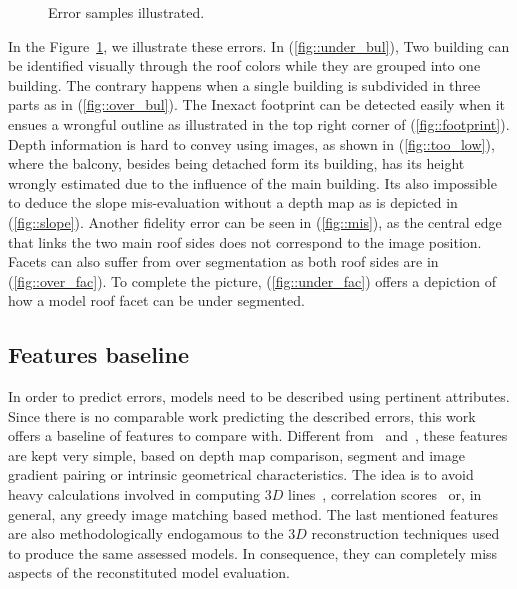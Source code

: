 \documentclass[runningheads]{llncs}
\newcounter{SubFigCounter}
\begin{document}
\begin{figure}[H]
\begin{center}
{{                    \label{fig::fac_err}
                    \addtocounter{figure}{-1}
                }
            }
            {
                \caption{\label{fig::samples}Error samples illustrated.}
            }
        \end{center}
    \end{figure}

    In the Figure~\ref{fig::samples}, we illustrate these errors. In (\ref{fig::under_bul}), Two building can be identified visually through the roof colors while they are grouped into one building. The contrary happens when a single building is subdivided in three parts as in (\ref{fig::over_bul}). The Inexact footprint can be detected easily when it ensues a wrongful outline as illustrated in the top right corner of (\ref{fig::footprint}). Depth information is hard to convey using images, as shown in (\ref{fig::too_low}), where the balcony, besides being detached form its building, has its height wrongly estimated due to the influence of the main building. Its also impossible to deduce the slope mis-evaluation without a depth map as is depicted in (\ref{fig::slope}). Another fidelity error can be seen in (\ref{fig::mis}), as the central edge that links the two main roof sides does not correspond to the image position. Facets can also suffer from over segmentation as both roof sides are in (\ref{fig::over_fac}). To complete the picture, (\ref{fig::under_fac}) offers a depiction of how a model roof facet can be under segmented.

\subsection{Features baseline}
In order to predict errors, models need to be described using pertinent attributes. Since there is no comparable work predicting the described errors, this work offers a baseline of features to compare with. Different from~\cite{boudet2006supervised} and~\cite{Michelin2013}, these features are kept very simple, based on depth map comparison, segment and image gradient pairing or intrinsic geometrical characteristics. The idea is to avoid heavy calculations involved in computing $3D$ lines~\cite{Michelin2013}, correlation scores~\cite{boudet2006supervised} or, in general, any greedy image matching based method. The last mentioned features are also methodologically endogamous to the $3D$ reconstruction techniques used to produce the same assessed models. In consequence, they can completely miss aspects of the reconstituted model evaluation.
\end{document}
